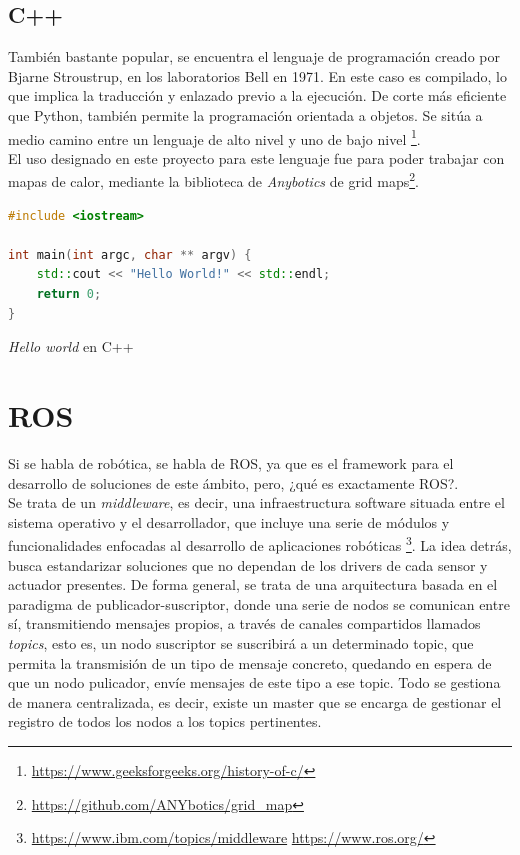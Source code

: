 \subsection{C++}
\label{subsec:cplusplus}

También bastante popular, se encuentra el lenguaje de programación creado por Bjarne Stroustrup, en los laboratorios Bell en 1971. En este caso es compilado, lo que implica la traducción y enlazado previo a la ejecución. De corte más eficiente que Python, también permite la programación orientada a objetos. Se sitúa a medio camino entre un lenguaje de alto nivel y uno de bajo nivel \footnote[4]{\url{https://www.geeksforgeeks.org/history-of-c/}}.\\

El uso designado en este proyecto para este lenguaje fue para poder trabajar con mapas de calor, mediante la biblioteca de \emph{Anybotics} de grid maps\footnote[5]{\url{https://github.com/ANYbotics/grid_map}}.

\begin{code}[H]
\begin{lstlisting}[language=C++]
#include <iostream>

int main(int argc, char ** argv) {
    std::cout << "Hello World!" << std::endl;
    return 0;
}
\end{lstlisting}
\caption[Hello world en C++]{\emph{Hello world} en C++}
\label{cod:helloworld_cplusplus}
\end{code}

\section{\ac{ROS}}
\label{sec:ros}

Si se habla de robótica, se habla de \ac{ROS}, ya que es el framework para el desarrollo de soluciones de este ámbito, pero, ¿qué es exactamente \ac{ROS}?.\\

Se trata de un \emph{middleware}, es decir, una infraestructura software situada entre el sistema operativo y el desarrollador, que incluye una serie de módulos y funcionalidades enfocadas al desarrollo de aplicaciones robóticas \footnote[6]{\url{https://www.ibm.com/topics/middleware} \url{https://www.ros.org/}}. La idea detrás, busca estandarizar soluciones que no dependan de los drivers de cada sensor y actuador presentes. De forma general, se trata de una arquitectura basada en el paradigma de publicador-suscriptor, donde una serie de nodos se comunican entre sí, transmitiendo mensajes propios, a través de canales compartidos llamados \emph{topics}, esto es, un nodo suscriptor se suscribirá a un determinado topic, que permita la transmisión de un tipo de mensaje concreto, quedando en espera de que un nodo pulicador, envíe mensajes de este tipo a ese topic. Todo se gestiona de manera centralizada, es decir, existe un master que se encarga de gestionar el registro de todos los nodos a los topics pertinentes.\\

